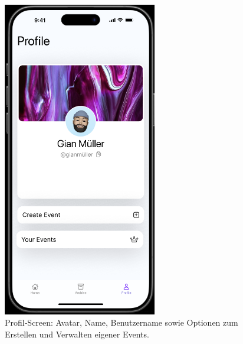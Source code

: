 \documentclass[11pt,a4paper]{article}
\begin{document}
\begin{figure}[h]
  \centering
  \includegraphics[width=0.6\textwidth]{image-5.png}
  \caption{Profil‑Screen: Avatar, Name, Benutzername sowie Optionen zum Erstellen und Verwalten eigener Events.}
  \label{fig:profile}
\end{figure}
\end{document}
